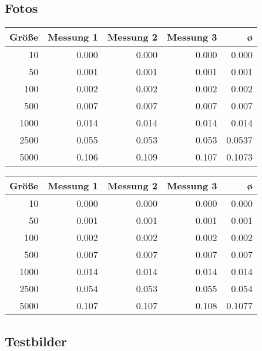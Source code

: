 \documentclass[a4paper, 10pt, twoside, onecolumn, parskip]{scrartcl}
\begin{document}
    \subsection{Fotos} \label{subsec:fotos}

    \begin{center}
        \begin{tabular}{|r|r|r|r|r|}
            \hline
            Größe & Messung 1 & Messung 2 & Messung 3 & ø \\ \hline
            10 & 0.000 & 0.000 & 0.000 & 0.000 \\ \hline
            50 & 0.001 & 0.001 & 0.001 & 0.001 \\ \hline
            100 & 0.002 & 0.002 & 0.002 & 0.002 \\ \hline
            500 & 0.007 & 0.007 & 0.007 & 0.007 \\ \hline
            1000 & 0.014 & 0.014 & 0.014 & 0.014 \\ \hline
            2500 & 0.055 & 0.053 & 0.053 & 0.0537 \\ \hline
            5000 & 0.106 & 0.109 & 0.107 & 0.1073 \\ \hline
        \end{tabular}
    \end{center}

    \begin{center}
        \begin{tabular}{|r|r|r|r|r|}
            \hline
            Größe & Messung 1 & Messung 2 & Messung 3 & ø \\ \hline
            10 & 0.000 & 0.000 & 0.000 & 0.000 \\ \hline
            50 & 0.001 & 0.001 & 0.001 & 0.001 \\ \hline
            100 & 0.002 & 0.002 & 0.002 & 0.002 \\ \hline
            500 & 0.007 & 0.007 & 0.007 & 0.007 \\ \hline
            1000 & 0.014 & 0.014 & 0.014 & 0.014 \\ \hline
            2500 & 0.054 & 0.053 & 0.055 & 0.054 \\ \hline
            5000 & 0.107 & 0.107 & 0.108 & 0.1077 \\ \hline
        \end{tabular}
    \end{center}

    \subsection{Testbilder} \label{subsec:testbilder}
\end{document}
